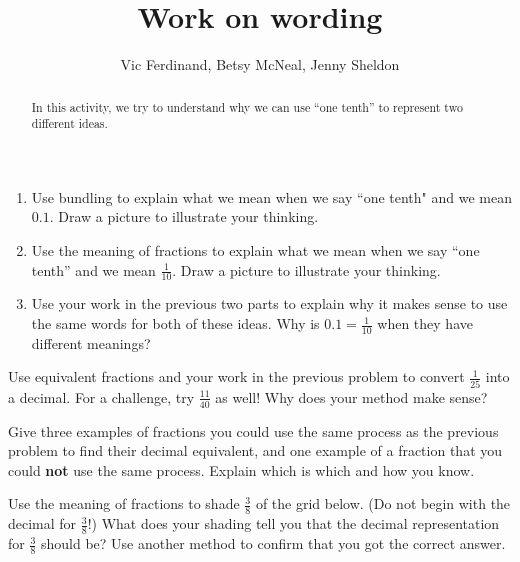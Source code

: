 \documentclass[noauthor, nooutcomes, handout]{ximera}
\title{Work on wording}
\author{Vic Ferdinand, Betsy McNeal, Jenny Sheldon}
\begin{document}
\begin{abstract} 
In this activity, we try to understand why we can use ``one tenth'' to represent two different ideas.
\end{abstract}
\maketitle



\begin{problem}
\begin{enumerate}
	\item Use bundling to explain what we mean when we say ``one tenth" and we mean $0.1$. Draw a picture to illustrate your thinking.
	\item Use the meaning of fractions to explain what we mean when we say ``one tenth'' and we mean $\frac{1}{10}$. Draw a picture to illustrate your thinking.
	\item Use your work in the previous two parts to explain why it makes sense to use the same words for both of these ideas. Why is $0.1 = \frac{1}{10}$ when they have different meanings?
\end{enumerate}

\end{problem}


\begin{problem}
Use equivalent fractions and your work in the previous problem to convert $\frac{1}{25}$ into a decimal. For a challenge, try $\frac{11}{40}$ as well! Why does your method make sense?
\end{problem}

\begin{problem}
Give three examples of fractions you could use the same process as the previous problem to find their decimal equivalent, and one example of a fraction that you could {\bf not} use the same process. Explain which is which and how you know.
\end{problem}



\begin{problem}
Use the meaning of fractions to shade $\frac{3}{8}$ of the grid below. (Do not begin with the decimal for $\frac{3}{8}$!) What does your shading tell you that the decimal representation for $\frac{3}{8}$ should be? Use another method to confirm that you got the correct answer.
\begin{center}
\end{center}
\end{problem}
\end{document}
